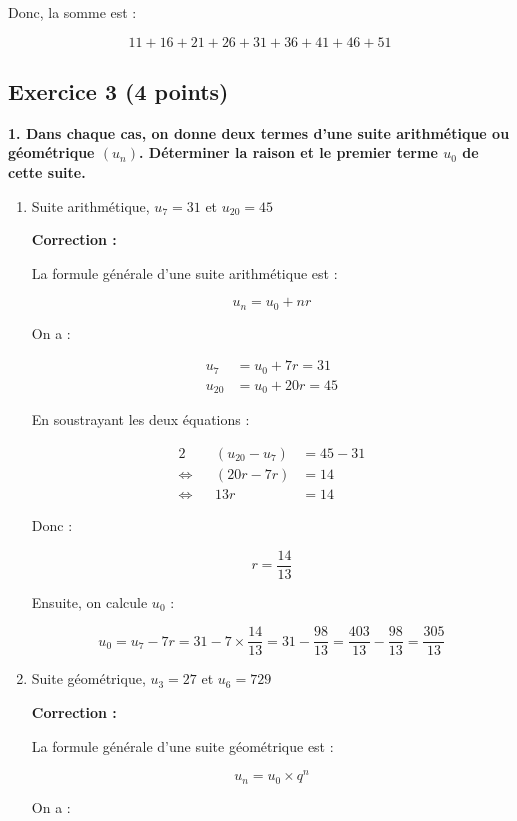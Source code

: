 \documentclass{article}
\begin{document}
Donc, la somme est :

\[ 11 + 16 + 21 + 26 + 31 + 36 + 41 + 46 + 51 \]

\bigskip

\subsection*{Exercice 3 (4 points)}

\textbf{1. Dans chaque cas, on donne deux termes d'une suite arithmétique ou géométrique \( (u_n) \). Déterminer la raison et le premier terme \( u_0 \) de cette suite.}

\begin{enumerate}[label=\alph*)]

\item Suite arithmétique, \( u_7 = 31 \) et \( u_{20} = 45 \)

\textbf{Correction :}

La formule générale d'une suite arithmétique est :

\[ u_n = u_0 + n r \]

On a :

\begin{align*}
u_7 &= u_0 + 7 r = 31 \\
u_{20} &= u_0 + 20 r = 45
\end{align*}

En soustrayant les deux équations :

\begin{alignat}{2}
    && (u_{20} - u_7) &= 45 - 31\\
    \iff && (20 r - 7 r) &= 14\\
    \iff && 13r &= 14
\end{alignat}

Donc :

\[ r = \dfrac{14}{13} \]

Ensuite, on calcule \( u_0 \) :

\[ u_0 = u_7 - 7 r = 31 - 7 \times \dfrac{14}{13} = 31 - \dfrac{98}{13} = \dfrac{403}{13} - \dfrac{98}{13} = \dfrac{305}{13} \]

\bigskip

\item Suite géométrique, \( u_3 = 27 \) et \( u_{6} = 729 \)

\textbf{Correction :}

La formule générale d'une suite géométrique est :

\[ u_n = u_0 \times q^n \]

On a :


\end{enumerate}
\end{document}
